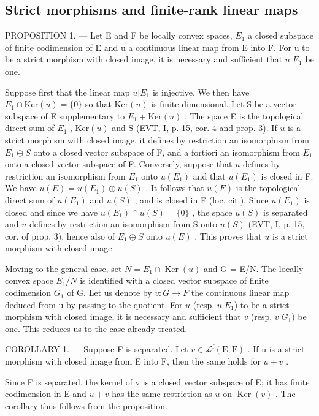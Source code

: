 \subsection{Strict morphisms and finite-rank linear maps}

PROPOSITION 1. --- Let E and F be locally convex spaces, \(E_{1}\) a closed subspace of finite codimension of E and u a continuous linear map from E into F. For u to be a strict morphism with closed image, it is necessary and sufficient that \(u|E_{1}\) be one.

Suppose first that the linear map \(u|E_1\) is injective. We then have \(E_1 \cap \text{Ker}(u) = \{0\}\) so that \(\text{Ker}(u)\) is finite-dimensional. Let S be a vector subspace of E supplementary to \(E_1 + \text{Ker}(u)\) . The space E is the topological direct sum of \(E_1\) , \(\text{Ker}(u)\) and S (EVT, I, p. 15, cor. 4 and prop. 3). If \(u\) is a strict morphism with closed image, it defines by restriction an isomorphism from \(E_1 \oplus S\) onto a closed vector subspace of F, and a fortiori an isomorphism from \(E_1\) onto a closed vector subspace of F. Conversely, suppose that \(u\) defines by restriction an isomorphism from \(E_1\) onto \(u(E_1)\) and that \(u(E_1)\) is closed in F. We have \(u(E) = u(E_1) \oplus u(S)\) . It follows that \(u(E)\) is the topological direct sum of \(u(E_1)\) and \(u(S)\) , and is closed in F (loc. cit.). Since \(u(E_1)\) is closed and since we have \(u(E_1) \cap u(S) = \{0\}\) , the space \(u(S)\) is separated and \(u\) defines by restriction an isomorphism from S onto \(u(S)\) (EVT, I, p. 15, cor. of prop. 3), hence also of \(E_1 \oplus S\) onto \(u(E)\) . This proves that \(u\) is a strict morphism with closed image.

Moving to the general case, set \(N = E_{1} \cap \operatorname{Ker}(u)\) and G = E/N. The locally convex space \(E_{1}/N\) is identified with a closed vector subspace of finite codimension \(G_{1}\) of G. Let us denote by \(v\colon G \to F\) the continuous linear map deduced from u by passing to the quotient. For \(u\) (resp. \(u|E_{1}\)) to be a strict morphism with closed image, it is necessary and sufficient that \(v\) (resp. \(v|G_{1}\)) be one. This reduces us to the case already treated.

COROLLARY 1. --- Suppose F is separated. Let \(v \in \mathcal{L}^{\mathrm{f}}(\mathrm{E};\mathrm{F})\) . If u is a strict morphism with closed image from E into F, then the same holds for \(u + v\) .

Since F is separated, the kernel of v is a closed vector subspace of E; it has finite codimension in E and \(u + v\) has the same restriction as \(u\) on \(\operatorname{Ker}(v)\) . The corollary thus follows from the proposition.

